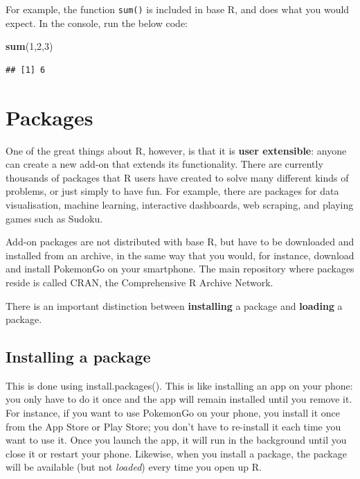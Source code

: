 \documentclass[
  oneside]{book}
\newenvironment{Shaded}{\begin{snugshade}}{\end{snugshade}}
\newcommand{\DecValTok}[1]{\textcolor[rgb]{0.00,0.00,0.81}{#1}}
\newcommand{\FunctionTok}[1]{\textcolor[rgb]{0.13,0.29,0.53}{\textbf{#1}}}
\newcommand{\NormalTok}[1]{#1}
\begin{document}
For example, the function \texttt{sum()} is included in base R, and does what you would expect. In the console, run the below code:

\begin{Shaded}
\begin{Highlighting}[]
\FunctionTok{sum}\NormalTok{(}\DecValTok{1}\NormalTok{,}\DecValTok{2}\NormalTok{,}\DecValTok{3}\NormalTok{)}
\end{Highlighting}
\end{Shaded}

\begin{verbatim}
## [1] 6
\end{verbatim}

\section{Packages}\label{packages}

One of the great things about R, however, is that it is \textbf{user extensible}: anyone can create a new add-on that extends its functionality. There are currently thousands of packages{} that R users have created to solve many different kinds of problems, or just simply to have fun. For example, there are packages for data visualisation, machine learning, interactive dashboards, web scraping, and playing games such as Sudoku.

Add-on packages are not distributed with base R, but have to be downloaded and installed from an archive, in the same way that you would, for instance, download and install PokemonGo on your smartphone. The main repository where packages reside is called CRAN{}, the Comprehensive R Archive Network.

There is an important distinction between \textbf{installing} a package and \textbf{loading} a package.

\subsection{Installing a package}\label{install-package}

This is done using {{install.packages}{(}{)}}. This is like installing an app on your phone: you only have to do it once and the app will remain installed until you remove it. For instance, if you want to use PokemonGo on your phone, you install it once from the App Store or Play Store; you don't have to re-install it each time you want to use it. Once you launch the app, it will run in the background until you close it or restart your phone. Likewise, when you install a package, the package will be available (but not \emph{loaded}) every time you open up R.
\end{document}
